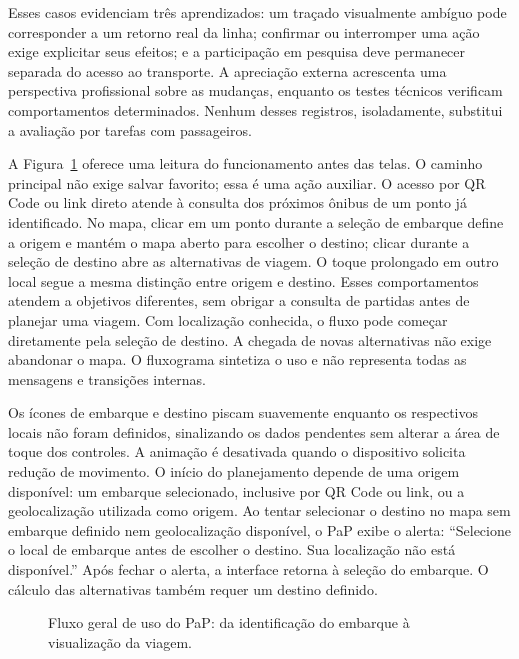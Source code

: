 \documentclass[12pt,oneside,a4paper,brazil,chapter=TITLE]{abntex2}
\begin{document}
Esses casos evidenciam três aprendizados: um traçado visualmente ambíguo pode corresponder a um retorno real da linha; confirmar ou interromper uma ação exige explicitar seus efeitos; e a participação em pesquisa deve permanecer separada do acesso ao transporte. A apreciação externa acrescenta uma perspectiva profissional sobre as mudanças, enquanto os testes técnicos verificam comportamentos determinados. Nenhum desses registros, isoladamente, substitui a avaliação por tarefas com passageiros.

A Figura~\ref{fig:fluxo-pap} oferece uma leitura do funcionamento antes das telas. O caminho principal não exige salvar favorito; essa é uma ação auxiliar. O acesso por QR Code ou link direto atende à consulta dos próximos ônibus de um ponto já identificado. No mapa, clicar em um ponto durante a seleção de embarque define a origem e mantém o mapa aberto para escolher o destino; clicar durante a seleção de destino abre as alternativas de viagem. O toque prolongado em outro local segue a mesma distinção entre origem e destino. Esses comportamentos atendem a objetivos diferentes, sem obrigar a consulta de partidas antes de planejar uma viagem. Com localização conhecida, o fluxo pode começar diretamente pela seleção de destino. A chegada de novas alternativas não exige abandonar o mapa. O fluxograma sintetiza o uso e não representa todas as mensagens e transições internas.

Os ícones de embarque e destino piscam suavemente enquanto os respectivos locais não foram definidos, sinalizando os dados pendentes sem alterar a área de toque dos controles. A animação é desativada quando o dispositivo solicita redução de movimento. O início do planejamento depende de uma origem disponível: um embarque selecionado, inclusive por QR Code ou link, ou a geolocalização utilizada como origem. Ao tentar selecionar o destino no mapa sem embarque definido nem geolocalização disponível, o PaP exibe o alerta: ``Selecione o local de embarque antes de escolher o destino. Sua localização não está disponível.'' Após fechar o alerta, a interface retorna à seleção do embarque. O cálculo das alternativas também requer um destino definido.

\begin{figure}[H]
\centering

\caption{Fluxo geral de uso do PaP: da identificação do embarque à visualização da viagem.}\label{fig:fluxo-pap}
\end{figure}
\end{document}
